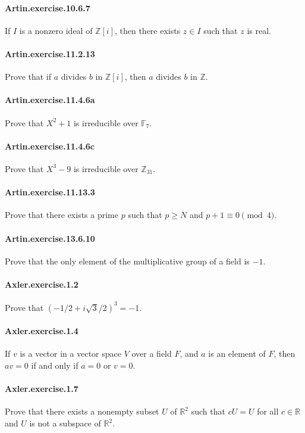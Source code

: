 \documentclass{article}
\begin{document}
\paragraph{Artin.exercise.10.6.7} If $I$ is a nonzero ideal of $\mathbb{Z}[i]$, then there exists $z\in I$ such that $z$ is real.

\paragraph{Artin.exercise.11.2.13} Prove that if $a$ divides $b$ in $\mathbb{Z}[i]$, then $a$ divides $b$ in $\mathbb{Z}$.

\paragraph{Artin.exercise.11.4.6a} Prove that $X^2+1$ is irreducible over $\mathbb{F}_7$.

\paragraph{Artin.exercise.11.4.6c} Prove that $X^3-9$ is irreducible over $\mathbb{Z}_{31}$.

\paragraph{Artin.exercise.11.13.3} Prove that there exists a prime $p$ such that $p\geq N$ and $p+1\equiv 0\pmod{4}$.

\paragraph{Artin.exercise.13.6.10} Prove that the only element of the multiplicative group of a field is $-1$.

\paragraph{Axler.exercise.1.2} Prove that $(-1/2 + i\sqrt{3}/2)^3 = -1$.

\paragraph{Axler.exercise.1.4} If $v$ is a vector in a vector space $V$ over a field $F$, and $a$ is an element of $F$, then $av=0$ if and only if $a=0$ or $v=0$.

\paragraph{Axler.exercise.1.7} Prove that there exists a nonempty subset $U$ of $\mathbb{R}^2$ such that $cU=U$ for all $c\in\mathbb{R}$ and $U$ is not a subspace of $\mathbb{R}^2$.
\end{document}

